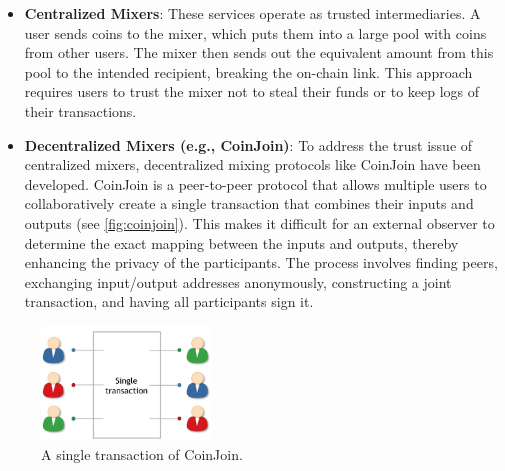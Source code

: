 \begin{itemize}
\tightlist
\item
  \textbf{Centralized Mixers}: These services operate as trusted
  intermediaries. A user sends coins to the mixer, which puts them into
  a large pool with coins from other users. The mixer then sends out the
  equivalent amount from this pool to the intended recipient, breaking
  the on-chain link. This approach requires users to trust the mixer not
  to steal their funds or to keep logs of their transactions.
\end{itemize}


\begin{itemize}
\tightlist
\item
  \textbf{Decentralized Mixers (e.g., CoinJoin)}: To address the trust issue
  of centralized mixers, decentralized mixing protocols like CoinJoin
  have been developed. CoinJoin is a peer-to-peer protocol that allows
  multiple users to collaboratively create a single transaction that
  combines their inputs and outputs (see \autoref{fig:coinjoin}). This makes it difficult for an
  external observer to determine the exact mapping between the inputs
  and outputs, thereby enhancing the privacy of the participants. The
  process involves finding peers, exchanging input/output addresses
  anonymously, constructing a joint transaction, and having all
  participants sign it.
\end{itemize}

\begin{figure}[t]
	\begin{center}
		\includegraphics[width=0.4\textwidth]{./figs/coinjoin.png}
		\caption{A single transaction of CoinJoin.}		
		\label{fig:coinjoin}
	\end{center}	
\end{figure}

